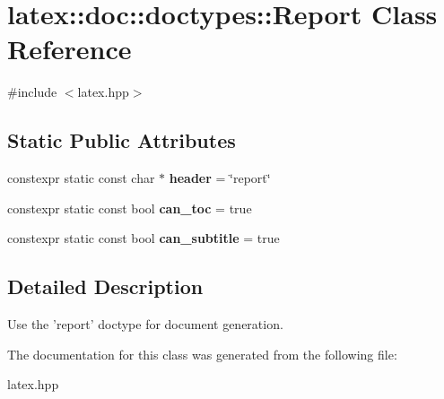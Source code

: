 \hypertarget{classlatex_1_1doc_1_1doctypes_1_1Report}{\section{latex\-:\-:doc\-:\-:doctypes\-:\-:Report Class Reference}
\label{classlatex_1_1doc_1_1doctypes_1_1Report}
}


{\ttfamily \#include $<$latex.\-hpp$>$}

\subsection*{Static Public Attributes}
\begin{DoxyCompactItemize}
\item 
\hypertarget{classlatex_1_1doc_1_1doctypes_1_1Report_a5cd2e9ac45e9d971f96302e62e5c1748}{constexpr static const char $\ast$ {\bfseries header} = \char`\"{}report\char`\"{}}\label{classlatex_1_1doc_1_1doctypes_1_1Report_a5cd2e9ac45e9d971f96302e62e5c1748}

\item 
\hypertarget{classlatex_1_1doc_1_1doctypes_1_1Report_a897a84cbb5dff210ac4f55807d692de9}{constexpr static const bool {\bfseries can\-\_\-toc} = true}\label{classlatex_1_1doc_1_1doctypes_1_1Report_a897a84cbb5dff210ac4f55807d692de9}

\item 
\hypertarget{classlatex_1_1doc_1_1doctypes_1_1Report_a7bbe0e3153ab8eaaf56cac0939afdbf0}{constexpr static const bool {\bfseries can\-\_\-subtitle} = true}\label{classlatex_1_1doc_1_1doctypes_1_1Report_a7bbe0e3153ab8eaaf56cac0939afdbf0}

\end{DoxyCompactItemize}


\subsection{Detailed Description}
Use the 'report' doctype for document generation. 

The documentation for this class was generated from the following file\-:\begin{DoxyCompactItemize}
\item 
latex.\-hpp\end{DoxyCompactItemize}
